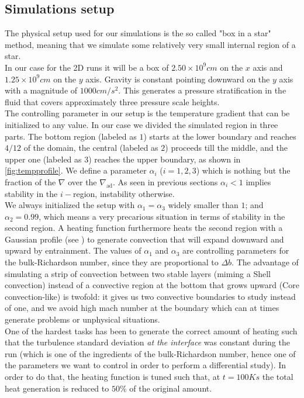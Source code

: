 \subsection{Simulations setup}
The physical setup used for our simulations is the so called "box in a star" method, meaning that we simulate some relatively very small internal region of a star. \\
In our case for the 2D runs it will be a box of $2.50 \times 10^{9} cm$ on the $x$ axis and $1.25 \times 10^{9} cm$ on the $y$ axis. Gravity is constant pointing downward on the $y$ axis with a magnitude of $1000 cm/s^2$. This generates a pressure stratification in the fluid that covers approximately three pressure scale heights. \\
The controlling parameter in our setup is the temperature gradient that can be initialized to any value. In our case we divided the simulated region in three parts. The bottom region (labeled as $1$) starts at the lower boundary and reaches $4/12$ of the domain, the central (labeled as $2$) proceeds till the middle, and the upper one (labeled as $3$) reaches the upper boundary, as shown in \ref{fig:tempprofile}. We define a parameter $\alpha_{i}$ ($i=1, 2, 3$) which is nothing but the fraction of the $\nabla$ over the $\nabla_{\mathrm{ad}}$. As seen in previous sections $\alpha_{i}<1$ implies stability in the $i-$region, instability otherwise. \\
We always initialized the setup with $\alpha_{1} = \alpha_{3}$ widely smaller than $1$; and $\alpha_{2}=0.99$, which means a very precarious situation in terms of stability in the second region. A heating function furthermore heats the second region with a Gaussian profile (see \label{fig:tempprofile}) to generate convection that will expand downward and upward by entrainment. The values of $\alpha_{1}$ and $\alpha_{3}$ are controlling parameters for the bulk-Richardson number, since they are proportional to $\Delta b$. The advantage of simulating a strip of convection between two stable layers (miming a Shell convection) instead of a convective region at the bottom that grows upward (Core convection-like) is twofold: it gives us two convective boundaries to study instead of one, and we avoid high mach number at the boundary which can at times generate problems or unphysical situations. \\
One of the hardest tasks has been to generate the correct amount of heating such that the turbulence standard deviation \textit{at the interface} was constant during the run (which is one of the ingredients of the bulk-Richardson number, hence one of the parameters we want to control in order to perform a differential study). In order to do that, the heating function is tuned such that, at $t=100K s$ the total heat generation is reduced to $50 \%$ of the original amount.\\ 
